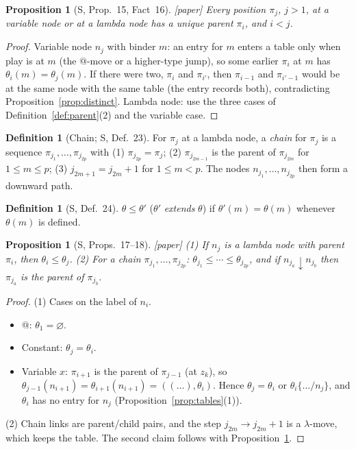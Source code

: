 \documentclass[11pt]{article}
\newcommand{\bnd}{\mathrel{\downarrow}}
\newcommand{\Paper}{\textsf{[paper]}}
\theoremstyle{plain}
\newtheorem{proposition}[theorem]{Proposition}
\theoremstyle{definition}
\newtheorem{definition}[theorem]{Definition}
\theoremstyle{remark}
\begin{document}
\begin{proposition}[S, Prop.~15, Fact~16]\label{prop:parent}
\Paper{} Every position $\pi_j$, $j>1$, at a variable node or at a lambda
node has a unique parent $\pi_i$, and $i<j$.
\end{proposition}
\begin{proof}
Variable node $n_j$ with binder $m$: an entry for $m$ enters a table
only when play is at $m$ (the $@$-move or a higher-type jump), so some
earlier $\pi_i$ at $m$ has $\theta_i(m)=\theta_j(m)$.  If there were two,
$\pi_i$ and $\pi_{i'}$, then $\pi_{i-1}$ and $\pi_{i'-1}$ would be at the
same node with the same table (the entry records both), contradicting
Proposition~\ref{prop:distinct}.  Lambda node: use the three cases of
Definition~\ref{def:parent}(2) and the variable case.
\end{proof}

\begin{definition}[Chain; S, Def.~23]\label{def:chain}
For $\pi_j$ at a lambda node, a \emph{chain} for $\pi_j$ is a sequence
$\pi_{j_1},\dots,\pi_{j_{2p}}$ with
(1) $\pi_{j_{2p}}=\pi_j$;
(2) $\pi_{j_{2m-1}}$ is the parent of $\pi_{j_{2m}}$ for $1\le m\le p$;
(3) $j_{2m+1}=j_{2m}+1$ for $1\le m<p$.
The nodes $n_{j_1},\dots,n_{j_{2p}}$ then form a downward path.
\end{definition}

\begin{definition}[S, Def.~24]
$\theta\le\theta'$ ($\theta'$ \emph{extends} $\theta$) if $\theta'(m)=\theta(m)$
whenever $\theta(m)$ is defined.
\end{definition}

\begin{proposition}[S, Props.~17--18]\label{prop:mono}
\Paper{}
(1) If $n_j$ is a lambda node with parent $\pi_i$, then
$\theta_i\le\theta_j$.
(2) For a chain $\pi_{j_1},\dots,\pi_{j_{2p}}$:
$\theta_{j_1}\le\cdots\le\theta_{j_{2p}}$, and if $n_{j_a}\bnd n_{j_b}$
then $\pi_{j_a}$ is the parent of $\pi_{j_b}$.
\end{proposition}
\begin{proof}
(1) Cases on the label of $n_i$.
\begin{itemize}
\item $@$: $\theta_1=\varnothing$.
\item Constant: $\theta_j=\theta_i$.
\item Variable $x$: $\pi_{i+1}$ is the parent of $\pi_{j-1}$ (at $z_k$),
  so $\theta_{j-1}(n_{i+1})=\theta_{i+1}(n_{i+1})=((\dots),\theta_i)$.
  Hence $\theta_j=\theta_i$ or $\theta_i\{\dots/n_j\}$, and $\theta_i$
  has no entry for $n_j$ (Proposition~\ref{prop:tables}(1)).
\end{itemize}
(2) Chain links are parent/child pairs, and the step $j_{2m}\to
j_{2m}+1$ is a $\lambda$-move, which keeps the table.  The second claim
follows with Proposition~\ref{prop:parent}.
\end{proof}
\end{document}
